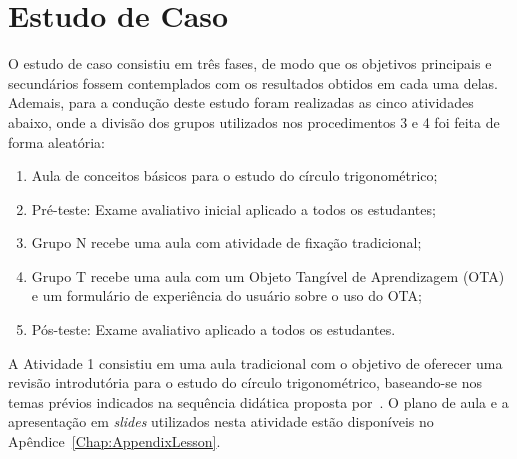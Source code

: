 

\section{Estudo de Caso}\label{sec:estudo_caso1}

O estudo de caso consistiu em três fases, de modo que os objetivos principais e secundários fossem contemplados com os resultados obtidos em cada uma delas. Ademais, %
para a condução deste estudo foram realizadas as cinco atividades abaixo, onde a divisão dos grupos utilizados nos procedimentos 3 e 4 foi feita de forma aleatória:

\begin{enumerate}
	\item Aula de conceitos básicos para o estudo do círculo trigonométrico;
	\item Pré-teste: Exame avaliativo inicial aplicado a todos os estudantes;
	\item Grupo N recebe uma aula com atividade de fixação tradicional;
	\item Grupo T recebe uma aula com um Objeto Tangível de Aprendizagem (OTA) e um formulário de experiência do usuário sobre o uso do OTA;
	\item Pós-teste: Exame avaliativo aplicado a todos os estudantes.
\end{enumerate}

A Atividade 1 consistiu em uma aula tradicional com o objetivo de oferecer uma revisão introdutória para o estudo do círculo trigonométrico, baseando-se nos temas prévios indicados na sequência didática proposta por~\cite{silva:2011}. O plano de aula e a apresentação em \textit{slides} utilizados nesta atividade estão disponíveis no Apêndice~\ref{Chap:AppendixLesson}.


